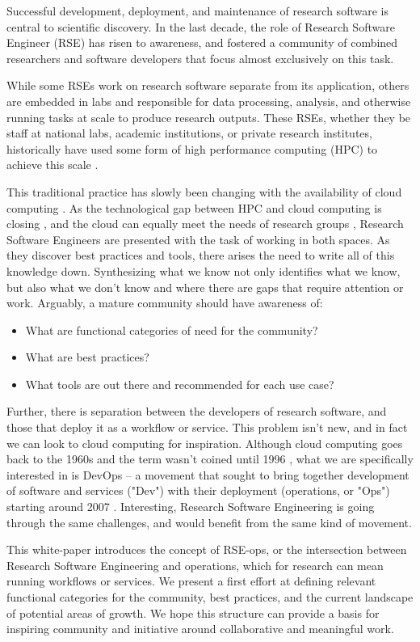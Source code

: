 Successful development, deployment, and maintenance of research software is central to scientific discovery. In the last decade, the role of Research Software Engineer (RSE) \cite{rse-history} has risen to awareness, and fostered a community of combined researchers and software developers that focus almost exclusively on this task. 

While some RSEs work on research software separate from its application, others are embedded in labs and responsible for data processing, analysis, and otherwise running tasks at scale to produce research outputs. These RSEs, whether they be staff at national labs, academic institutions, or private research institutes, historically have used some form of high performance computing (HPC) to achieve this scale \cite{Wikipedia_contributors2021-kg, xsede-history-of-hpc}. 

This traditional practice has slowly been changing with the availability of cloud computing \cite{Scality2020-of}. As the technological gap between HPC and cloud computing is closing \cite{Guidi2020-ht}, and the cloud can equally meet the needs of research groups \cite{noauthor_2020-mn}, Research Software Engineers are presented with the task of working in both spaces. As they discover best practices and tools, there arises the need to write all of this knowledge down. Synthesizing what we know not only identifies what we know, but also what we don't know and where there are gaps that require attention or work. Arguably, a mature community should have awareness of:

\begin{itemize}
\item What are functional categories of need for the community?
\item What are best practices?
\item What tools are out there and recommended for each use case?
\end{itemize}

Further, there is separation between the developers of research software, and those that deploy it as a workflow or service. This problem isn't new, and in fact we can look to cloud computing for inspiration. Although cloud computing goes back to the 1960s \cite{Foote2017-fi} and the term wasn't coined until 1996 \cite{Scality2020-of}, what we are specifically interested in is DevOps -- a movement that sought to bring together development of software and services ("Dev") with their deployment (operations, or "Ops") starting around 2007 \cite{Atlassian_undated-ka}. Interesting, Research Software Engineering is going through the same challenges, and would benefit from the same kind of movement.

This white-paper introduces the concept of RSE-ops, or the intersection between Research Software Engineering and operations, which for research can mean running workflows or services. We present a first effort at defining relevant functional categories for the community, best practices, and the current landscape of potential areas of growth. We hope this structure can provide a basis for inspiring community and initiative around collaborative and meaningful work.
